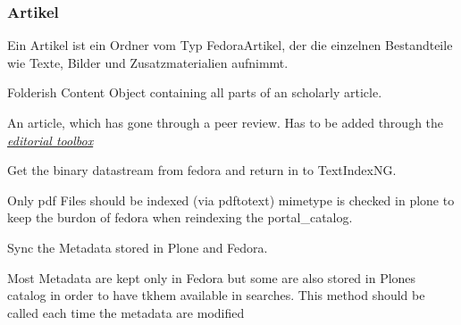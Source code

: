 \documentclass[a4paper,10pt,ngerman]{sphinxmanual}
\begin{document}
\subsubsection{Artikel}
\label{contenttypen:artikel}
Ein Artikel ist ein Ordner vom Typ FedoraArtikel, der die einzelnen Bestandteile
wie Texte, Bilder und Zusatzmaterialien aufnimmt.

\begin{fulllineitems}
\label{contenttypen:Products.DiPP.content.fedoraarticle.FedoraArticle}
Folderish Content Object containing all parts of an scholarly article.

An article, which has gone through a peer review. Has to be added through the
{\hyperref[editorial_toolbox:editorial-toolbox]{\emph{editorial toolbox}}}

\begin{fulllineitems}
\label{contenttypen:Products.DiPP.content.fedoraarticle.FedoraArticle.indexableContent}
Get the binary datastream from fedora and return in to TextIndexNG.

Only pdf Files should be indexed (via pdftotext) mimetype is checked in plone
to keep the burdon of fedora when reindexing the portal\_catalog.

\end{fulllineitems}


\begin{fulllineitems}
\label{contenttypen:Products.DiPP.content.fedoraarticle.FedoraArticle.syncMetadata}
Sync the Metadata stored in Plone and Fedora.

Most Metadata are kept only in Fedora but some are also stored in Plones
catalog in order to have tkhem available in searches. This method should
be called each time the metadata are modified

\end{fulllineitems}



\end{fulllineitems}
\end{document}

